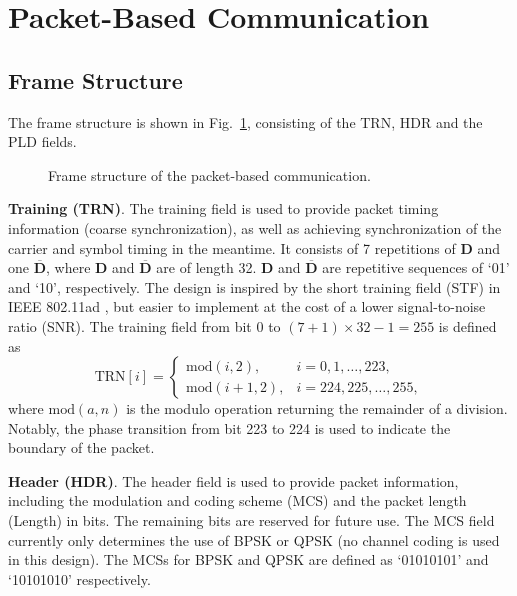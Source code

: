 \documentclass[journal,twoside]{IEEEtran}
\begin{document}
  \section{Packet-Based Communication}\label{sec:packet-based}

    \subsection{Frame Structure}\label{subsec:frame_structure}

      The frame structure is shown in Fig.~\ref{fig:frame_structure},
      consisting of the TRN, HDR and the PLD fields.
      \begin{figure}[htbp]
        \centering
        
        \caption{Frame structure of the packet-based communication.}
        \label{fig:frame_structure}
      \end{figure}

    \textbf{Training (TRN)}.
    The training field is used to provide packet timing information (coarse synchronization),
    as well as achieving synchronization of the carrier and symbol timing in the meantime.
    It consists of 7 repetitions of $\mathbf{D}$ and one $\overline{\mathbf{D}}$,
    where $\mathbf{D}$ and $\overline{\mathbf{D}}$ are of length 32.
    $\mathbf{D}$ and $\overline{\mathbf{D}}$ are repetitive sequences of `01' and `10', respectively.
    The design is inspired by the short training field (STF) in IEEE 802.11ad \cite{IEEE802.11ad},
    but easier to implement at the cost of a lower signal-to-noise ratio (SNR).
    The training field from bit $0$ to $(7+1)\times32-1=255$ is defined as
    \begin{equation}
      \mathrm{TRN}[i]=\begin{cases}
        \mathrm{mod}(i,2), & i=0,1,\dots,223,\\
        \mathrm{mod}(i+1,2), & i=224,225,\dots,255,
      \end{cases}
    \end{equation}
    where $\mathrm{mod}(a,n)$ is the modulo operation returning the remainder of a division.
    Notably, the phase transition from bit 223 to 224 is used to indicate the boundary of the packet.

    \textbf{Header (HDR)}.
    The header field is used to provide packet information,
    including the modulation and coding scheme (MCS) and the packet length (Length) in bits.
    The remaining bits are reserved for future use.
    The MCS field currently only determines the use of BPSK or QPSK (no channel coding is used in this design).
    The MCSs for BPSK and QPSK are defined as `01010101' and `10101010' respectively.
\end{document}
